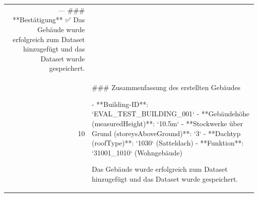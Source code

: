 \documentclass[a4paper,11pt]{article}
\begin{document}
\begin{table}[ht]
\begin{tabular}{r p{12cm}}
---
\#\#\# **Bestätigung**
✅ Das Gebäude wurde erfolgreich zum Dataset hinzugefügt und das Dataset wurde gespeichert. \\
10 & \#\#\# Zusammenfassung des erstellten Gebäudes

- **Building-ID**: `EVAL\_TEST\_BUILDING\_001`
- **Gebäudehöhe (measuredHeight)**: `10.5m`
- **Stockwerke über Grund (storeysAboveGround)**: `3`
- **Dachtyp (roofType)**: `1030` (Satteldach)
- **Funktion**: `31001\_1010` (Wohngebäude)

Das Gebäude wurde erfolgreich zum Dataset hinzugefügt und das Dataset wurde gespeichert. \\
\hline
\end{tabular}
\end{table}

\clearpage
\end{document}
